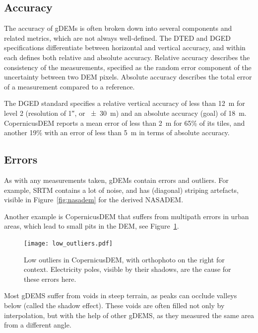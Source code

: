 \subsection{Accuracy}

The accuracy of gDEMs is often broken down into several components and related metrics, which are not always well-defined.
The DTED and DGED specifications differentiate between horizontal and vertical accuracy, and within each defines both relative and absolute accuracy.
Relative accuracy describes the consistency of the measurements, specified as the random error component of the uncertainty between two DEM pixels. %
Absolute accuracy describes the total error of a measurement compared to a reference.

%

The DGED standard specifies a relative vertical accuracy of less than \qty{12}{m} for level 2 (resolution of \ang{;;1}, or \qty{\pm30}{m}) and an absolute accuracy (goal) of \qty{18}{m}.
CopernicusDEM reports a mean error of less than \qty{2}{m} for 65\% of its tiles, and another 19\% with an error of less than \qty{5}{m} in terms of absolute accuracy.


\subsection{Errors}

As with any measurements taken, gDEMs contain errors and outliers.
For example, SRTM contains a lot of noise, and has (diagonal) striping artefacts, visible in Figure~\ref{fig:nasadem} for the derived NASADEM\@.

%

Another example is CopernicusDEM that suffers from multipath errors in urban areas, which lead to small pits in the DEM, see Figure~\ref{fig:copernicus_error}.
\begin{figure}
  \centering
  \texttt{[image: low\_outliers.pdf]}
  \caption{Low outliers in CopernicusDEM, with orthophoto on the right for context. Electricity poles, visible by their shadows, are the cause for these errors here.}%
  \label{fig:copernicus_error}
\end{figure}

%

Most gDEMS suffer from voids in steep terrain, as peaks can occlude valleys below (called the shadow effect).
These voids are often filled not only by interpolation, but with the help of other gDEMS, as they measured the same area from a different angle.

